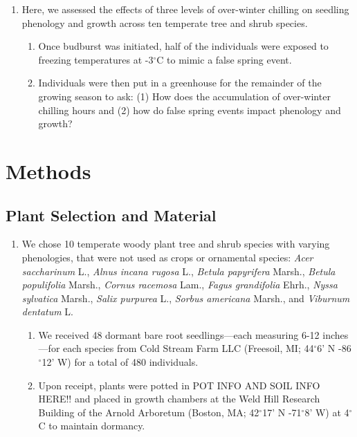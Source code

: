 \documentclass{article}\usepackage[]{graphicx}\usepackage[]{color}
\begin{document}
\begin{enumerate}
\item Here, we assessed the effects of three levels of over-winter chilling on seedling phenology and growth across ten temperate tree and shrub species. 
  \begin{enumerate}
  \item Once budburst was initiated, half of the individuals were exposed to freezing temperatures at -3$^{\circ}$C to mimic a false spring event. 
  \item Individuals were then put in a greenhouse for the remainder of the growing season to ask: (1) How does the accumulation of over-winter chilling hours and (2) how do false spring events impact phenology and growth?
  \end{enumerate}
\end{enumerate}
  
\section*{Methods}
\subsection*{Plant Selection and Material}
\begin{enumerate}
\item We chose 10 temperate woody plant tree and shrub species with varying phenologies, that were not used as crops or ornamental species: \textit{Acer saccharinum} L., \textit{Alnus incana rugosa} L., \textit{Betula papyrifera} Marsh., \textit{Betula populifolia} Marsh., \textit{Cornus racemosa} Lam., \textit{Fagus grandifolia} Ehrh., \textit{Nyssa sylvatica} Marsh., \textit{Salix purpurea} L., \textit{Sorbus americana} Marsh., and \textit{Viburnum dentatum} L.
  \begin{enumerate}
  \item We received 48 dormant bare root seedlings---each measuring 6-12 inches---for each species from Cold Stream Farm LLC (Freesoil, MI; 44$^{\circ}$6’ N -86$^{\circ}$12’ W) for a total of 480 individuals.
  \item Upon receipt, plants were potted in POT INFO AND SOIL INFO HERE!! and placed in growth chambers at the Weld Hill Research Building of the Arnold Arboretum (Boston, MA; 42$^{\circ}$17’ N -71$^{\circ}$8’ W) at 4$^{\circ}$C to maintain dormancy.
  \end{enumerate}
\end{enumerate}
\end{document}
